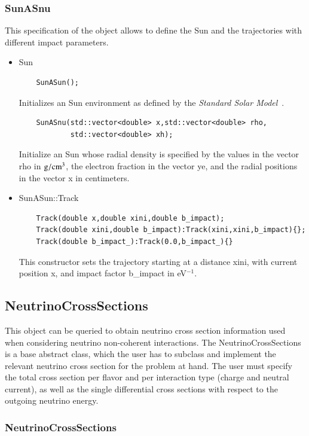 \documentclass[3p,12pt]{elsarticle}
\newcommand{\ttf}{\ttfamily}
\begin{document}
\subsubsection{{SunASnu}\label{sec:sunasnu}}
This specification of the object allows to define the Sun and the
trajectories with different impact parameters.
\begin{itemize}
\item {\ttf Sun}
  \begin{lstlisting}
    SunASun();
  \end{lstlisting}
  Initializes an {\ttf Sun} environment as defined by the {\it
    Standard Solar Model}~\citep{bahcall2005new}.
  \begin{lstlisting}
    SunASnu(std::vector<double> x,std::vector<double> rho,
            std::vector<double> xh);
  \end{lstlisting}
  Initialize an {\ttf Sun} whose radial density is specified by the
  values in the vector {\ttf rho} in ${\rm g}/{\rm cm}^3$, the
  electron fraction in the vector {\ttf ye}, and the radial positions
  in the vector {\ttf x} in centimeters. 
  
\item {\ttf SunASun::Track}
  \begin{lstlisting}
    Track(double x,double xini,double b_impact);
    Track(double xini,double b_impact):Track(xini,xini,b_impact){};
    Track(double b_impact_):Track(0.0,b_impact_){}
  \end{lstlisting}
  This constructor sets the trajectory starting at a distance 
  {\ttf xini}, with current position {\ttf x}, and impact factor {\ttf
    b\_impact} in eV$^{-1}$.
\end{itemize}


\subsection{NeutrinoCrossSections\label{sec:neutrino_cross_section}}
\label{sec:xs}
This object can be queried to obtain neutrino cross section information used when considering neutrino non-coherent interactions. The {\ttf NeutrinoCrossSections} is a base abstract class, which the user has to subclass and implement the relevant neutrino cross section for the problem at hand. The user must specify the total cross section per flavor and per interaction type (charge and neutral current), as well as the single differential cross sections with respect to the outgoing neutrino energy.

\subsubsection{NeutrinoCrossSections\label{sec:neutrino_cross_section_class}}
\end{document}
